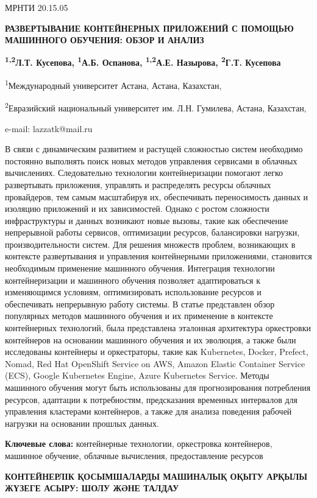 МРНТИ 20.15.05

\textbf{РАЗВЕРТЫВАНИЕ КОНТЕЙНЕРНЫХ ПРИЛОЖЕНИЙ С ПОМОЩЬЮ МАШИННОГО
ОБУЧЕНИЯ: ОБЗОР И АНАЛИЗ}

\textbf{\textsuperscript{1,2}Л.Т. Кусепова, \textsuperscript{1}А.Б.
Оспанова, \textsuperscript{1,2}А.Е. Назырова, \textsuperscript{2}Г.Т.
Кусепова}

\textsuperscript{1}Международный университет Астана, Астана, Казахстан,

\textsuperscript{2}Евразийский национальный университет им. Л.Н.
Гумилева, Астана, Казахстан,

e-mail: lazzatk@mail.ru

В связи с динамическим развитием и растущей сложностью систем необходимо
постоянно выполнять поиск новых методов управления сервисами в облачных
вычислениях. Следовательно технологии контейнеризации помогают легко
развертывать приложения, управлять и распределять ресурсы облачных
провайдеров, тем самым масштабируя их, обеспечивать переносимость данных
и изоляцию приложений и их зависимостей. Однако с ростом сложности
инфраструктуры и данных возникают новые вызовы, такие как обеспечение
непрерывной работы сервисов, оптимизации ресурсов, балансировки
нагрузки, производительности систем. Для решения множеств проблем,
возникающих в контексте развертывания и управления контейнерными
приложениями, становится необходимым применение машинного обучения.
Интеграция технологии контейнеризации и машинного обучения позволяет
адаптироваться к изменяющимся условиям, оптимизировать использование
ресурсов и обеспечивать непрерывную работу системы. В статье представлен
обзор популярных методов машинного обучения и их применение в контексте
контейнерных технологий, была представлена эталонная архитектура
оркестровки контейнеров на основании машинного обучения и их эволюция, а
также были исследованы контейнеры и оркестраторы, такие как Kubernetes,
Docker, Prefect, Nomad, Red Hat OpenShift Service on AWS, Amazon Elastic
Container Service (ECS), Google Kubernetes Engine, Azure Kubernetes
Service. Методы машинного обучения могут быть использованы для
прогнозирования потребления ресурсов, адаптации к потребностям,
предсказания временных интервалов для управления кластерами контейнеров,
а также для анализа поведения рабочей нагрузки на основании прошлых
данных.

\textbf{Ключевые слова:} контейнерные технологии, оркестровка
контейнеров, машинное обучение, облачные вычисления, предоставление
ресурсов

\textbf{КОНТЕЙНЕРЛІК ҚОСЫМШАЛАРДЫ МАШИНАЛЫҚ ОҚЫТУ АРҚЫЛЫ ЖҮЗЕГЕ АСЫРУ:
ШОЛУ ЖӘНЕ ТАЛДАУ}

